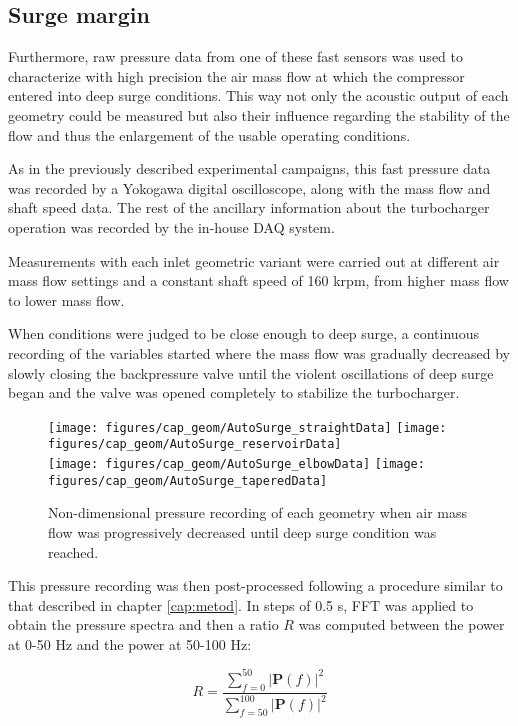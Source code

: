 \subsection{Surge margin}

Furthermore, raw pressure data from one of these fast sensors was used to characterize with high precision the air mass flow at which the compressor entered into deep surge conditions. This way not only the acoustic output of each geometry could be measured but also their influence regarding the stability of the flow and thus the enlargement of the usable operating conditions.

As in the previously described experimental campaigns, this fast pressure data was recorded by a Yokogawa digital oscilloscope, along with the mass flow and shaft speed data. The rest of the ancillary information about the turbocharger operation was recorded by the in-house DAQ system.

Measurements with each inlet geometric variant were carried out at different air mass flow settings and a constant shaft speed of 160 krpm, from higher mass flow to lower mass flow. 

When conditions were judged to be close enough to deep surge, a continuous recording of the variables started where the mass flow was gradually decreased by slowly closing the backpressure valve until the violent oscillations of deep surge began and the valve was opened completely to stabilize the turbocharger.

\begin{figure}[htb!]
\centering
\texttt{[image: figures/cap\_geom/AutoSurge\_straightData]}
\texttt{[image: figures/cap\_geom/AutoSurge\_reservoirData]}\\[3mm]
\texttt{[image: figures/cap\_geom/AutoSurge\_elbowData]}
\texttt{[image: figures/cap\_geom/AutoSurge\_taperedData]}
\caption{Non-dimensional pressure recording of each geometry when air mass flow was progressively decreased until deep surge condition was reached.}
\label{fig:autosurge_simple_geom}
\end{figure}

This pressure recording was then post-processed following a procedure similar to that described in chapter \ref{cap:metod}. In steps of 0.5 s, FFT was applied to obtain the pressure spectra and then a ratio $R$ was computed between the power at 0-50 Hz and the power at 50-100 Hz:

\begin{equation}
	R=\frac{\sum_{f=0}^{50}|\mathbf{P}(f)|^2}{\sum_{f=50}^{100}|\mathbf{P}(f)|^2}
\end{equation}

